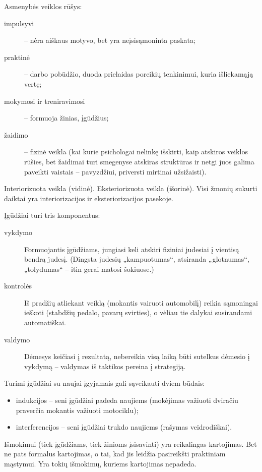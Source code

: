 Asmenybės veiklos rūšys:

\begin{description}
  \item[impulsyvi] – nėra aiškaus motyvo, bet yra neįsisąmoninta paskata;
  \item[praktinė] – darbo pobūdžio, duoda prielaidas poreikių tenkinimui,
    kuria išliekamąją vertę; %
  \item[mokymosi ir treniravimosi] – formuoja žinias, įgūdžius;
  \item[žaidimo] – fizinė veikla (kai kurie psichologai nelinkę išskirti,
    kaip atskiros veiklos rūšies, bet žaidimai turi smegenyse atskiras 
    struktūras ir netgi juos galima paveikti vaistais – pavyzdžiui, 
    priversti mirtinai užsižaisti).
\end{description}

Interiorizuota veikla (vidinė).
Eksteriorizuota veikla (išorinė).
Visi žmonių sukurti daiktai yra interiorizacijos ir eksteriorizacijos
pasekoje.

Įgūdžiai turi tris komponentus:

\begin{description}
  \item[vykdymo] Formuojantis įgūdžiams, jungiasi keli atskiri fiziniai
    judesiai į vientisą bendrą judesį. (Dingsta judesių „kampuotumas“, 
    atsiranda „glotnumas“, „tolydumas“ – itin gerai matosi šokiuose.)
  \item[kontrolės] 
    Iš pradžių atliekant veiklą (mokantis vairuoti automobilį)
    reikia sąmoningai ieškoti (stabdžių pedalo, pavarų svirties), o vėliau
    tie dalykai susirandami automatiškai.
  \item[valdymo] Dėmesys keičiasi į rezultatą, nebereikia visą laiką
    būti sutelkus dėmesio į vykdymą – valdymas iš taktikos pereina į
    strategiją.
\end{description}

Turimi įgūdžiai su naujai įgyjamais gali sąveikauti dviem būdais:

\begin{itemize}
  \item indukcijos – seni įgūdžiai padeda naujiems (mokėjimas važiuoti
    dviračiu praverčia mokantis važiuoti motociklu);
  \item interferencijos – seni įgūdžiai trukdo naujiems (rašymas 
    veidrodiškai).
\end{itemize}


Išmokimui (tiek įgūdžiams, tiek žinioms įsisavinti) yra reikalingas 
kartojimas. Bet ne pats formalus kartojimas, o tai, kad jis leidžia
pasireikšti praktiniam mąstymui. Yra tokių išmokimų, kuriems kartojimas
nepadeda.
